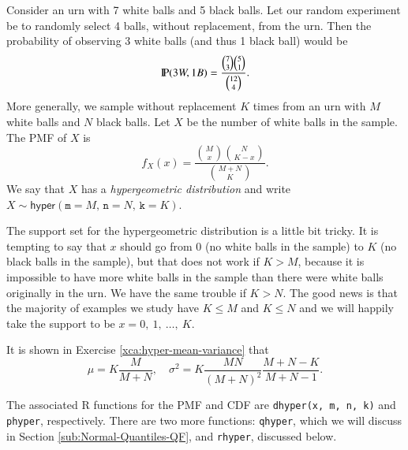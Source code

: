 \documentclass[captions=tableheading]{scrbook}
\begin{document}
Consider an urn with 7 white balls and 5 black balls. Let our random experiment be to randomly select 4 balls, without replacement, from the urn. Then the probability of observing 3 white balls (and thus 1 black ball) would be
\begin{equation}
\P(3W,1B)=\frac{{7 \choose 3}{5 \choose 1}}{{12 \choose 4}}.
\end{equation}
More generally, we sample without replacement \(K\) times from an urn with \(M\) white balls and \(N\) black balls. Let \(X\) be the number of white balls in the sample. The PMF of \(X\) is
\begin{equation}
f_{X}(x)=\frac{{M \choose x}{N \choose K-x}}{{M+N \choose K}}.
\end{equation}
We say that \(X\) has a \emph{hypergeometric distribution} and write \(X\sim\mathsf{hyper}(\mathtt{m}=M,\,\mathtt{n}=N,\,\mathtt{k}=K)\).

The support set for the hypergeometric distribution is a little bit tricky. It is tempting to say that \(x\) should go from 0 (no white balls in the sample) to \(K\) (no black balls in the sample), but that does not work if \(K>M\), because it is impossible to have more white balls in the sample than there were white balls originally in the urn. We have the same trouble if \(K>N\). The good news is that the majority of examples we study have \(K\leq M\) and \(K\leq N\) and we will happily take the support to be \(x=0,\ 1,\ \ldots,\ K\). 

It is shown in Exercise \ref{xca:hyper-mean-variance} that
\begin{equation}
\mu=K\frac{M}{M+N},\quad\sigma^{2}=K\frac{MN}{(M+N)^{2}}\frac{M+N-K}{M+N-1}.
\end{equation}

The associated \textsf{R} functions for the PMF and CDF are \texttt{dhyper(x, m, n, k)} and \texttt{phyper}, respectively. There are two more functions: \texttt{qhyper}, which we will discuss in Section \ref{sub:Normal-Quantiles-QF}, and \texttt{rhyper}, discussed below.
\end{document}
